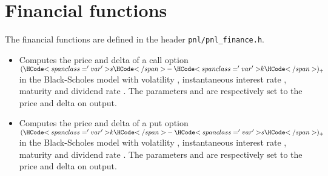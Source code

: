 
\section{Financial functions}

The financial functions are defined in the header \verb!pnl/pnl_finance.h!.\\

\begin{itemize}
\item
  \sshortdescribe Computes the price and delta of a call option $(\var{s} -
  \var{k})_+$ in the Black-Scholes model with volatility ,
  instantaneous interest rate , maturity  and dividend rate
  . The parameters  and  are respectively
  set to the price and delta on output.

\item
  \sshortdescribe Computes the price and delta of a put option $(\var{k} - 
  \var{s})_+$ in the Black-Scholes model with volatility ,
  instantaneous interest rate , maturity  and dividend rate
  .  The parameters  and  are respectively
  set to the price and delta on output.

\end{itemize}


